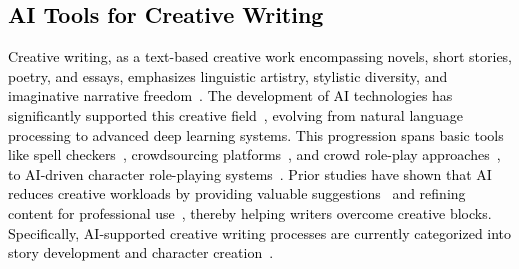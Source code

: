 \subsection{\textcolor{black}{AI Tools for Creative Writing}}
\textcolor{black}{Creative writing, as a text-based creative work encompassing novels, short stories, poetry, and essays, emphasizes linguistic artistry, stylistic diversity, and imaginative narrative freedom~\cite{ramet2011creative, smith2020writing, mcvey2008all}. The development of AI technologies has significantly supported this creative field~\cite{10.1145/3613904.3642529}, evolving from natural language processing to advanced deep learning systems. This progression spans basic tools like spell checkers~\cite{peterson1980computer}, crowdsourcing platforms~\cite{kim2017mechanical, kim2014ensemble}, and crowd role-play approaches~\cite{huang2020heteroglossia}, to AI-driven character role-playing systems~\cite{10.1145/3613904.3642105}. Prior studies have shown that AI reduces creative workloads by providing valuable suggestions~\cite{gero2019stylistic, bernstein2010soylent} and refining content for professional use~\cite{hui2018introassist, roemmele2015creative, clark2018creative}, thereby helping writers overcome creative blocks. Specifically, AI-supported creative writing processes are currently categorized into story development and character creation~\cite{radford2019language, yang2019sketching, calderwood2020novelists, clark2018creative, coenen2021wordcraft}.}


